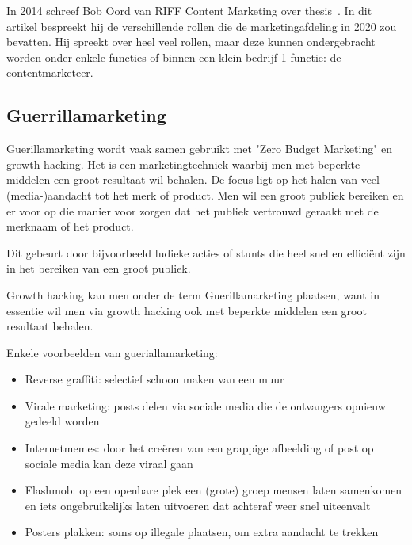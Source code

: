 In 2014 schreef Bob Oord van RIFF Content Marketing over thesis~. In dit artikel bespreekt hij de verschillende rollen die de marketingafdeling in 2020 zou bevatten. Hij spreekt over heel veel rollen, maar deze kunnen ondergebracht worden onder enkele functies of binnen een klein bedrijf 1 functie: de contentmarketeer. 

\subsection{Guerrillamarketing}
\label{sec:guerrillamarketing}
Guerillamarketing wordt vaak samen gebruikt met "Zero Budget Marketing" en growth hacking. Het is een marketingtechniek waarbij men met beperkte middelen een groot resultaat wil behalen. De focus ligt op het halen van veel (media-)aandacht tot het merk of product. Men wil een groot publiek bereiken en er voor op die manier voor zorgen dat het publiek vertrouwd geraakt met de merknaam of het product.

Dit gebeurt door bijvoorbeeld ludieke acties of stunts die heel snel en efficiënt zijn in het bereiken van een groot publiek. 

Growth hacking kan men onder de term Guerillamarketing plaatsen, want in essentie wil men via growth hacking ook met beperkte middelen een groot resultaat behalen.

Enkele voorbeelden van gueriallamarketing:
 
\begin{itemize}
	\item Reverse graffiti: selectief schoon maken van een muur 
	\item Virale marketing: posts delen via sociale media die de ontvangers opnieuw gedeeld worden
	\item Internetmemes: door het creëren van een grappige afbeelding of post op sociale media kan deze viraal gaan
	\item Flashmob: op een openbare plek een (grote) groep mensen laten samenkomen en iets ongebruikelijks laten uitvoeren dat achteraf weer snel uiteenvalt
	\item Posters plakken: soms op illegale plaatsen, om extra aandacht te trekken
\end{itemize}


